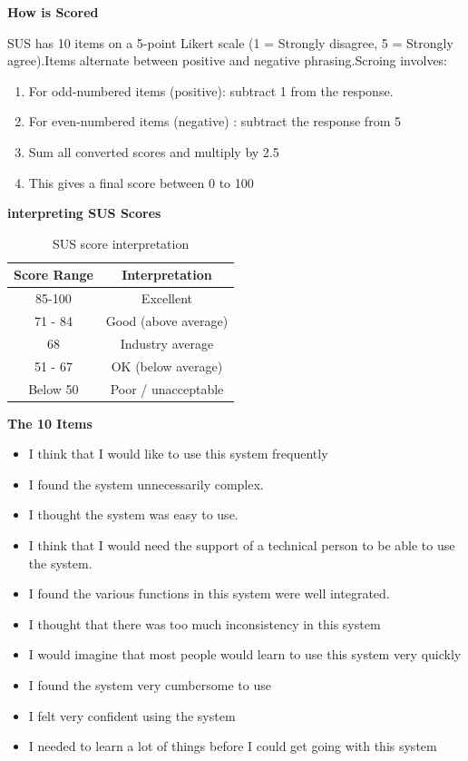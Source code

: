 \documentclass[12pt]{article}
\begin{document}
\textbf{How is Scored}

SUS has 10 items on a 5-point Likert scale (1 = Strongly disagree, 5 = Strongly agree).Items alternate between positive and negative phrasing.Scroing involves:
\begin{enumerate}
    \item For odd-numbered items (positive): subtract 1 from the response.
    \item For even-numbered items (negative) : subtract the response from 5
    \item Sum all converted scores and multiply by 2.5
    \item This gives a final score between 0 to 100
\end{enumerate}

\textbf{interpreting SUS Scores}
\begin{table}[h]
    \centering
    \begin{tabular}{c|c}
       \textbf{Score Range}  
         &  \textbf{Interpretation}
         \\
         \hline
         85-100 & Excellent
         \\
         \hline
         71 - 84 & Good (above average)
         \\
         \hline
         68 & Industry average
         \\
         \hline
         51 - 67 & OK (below average)
         \\
         \hline
         Below 50 & Poor / unacceptable
    \end{tabular}
    \caption{SUS score interpretation}
    \label{tab:placeholder}
\end{table}

\textbf{The 10 Items}
\begin{itemize}
    \item I think that I would like to use this system frequently
    \item I found the system unnecessarily complex.
    \item I thought the system was easy to use.
    \item I think that I would need the support of a technical person to be able to use the system.
    \item I found the various functions in this system were well integrated.
    \item I thought that there was too much inconsistency in this system
    \item I would imagine that most people would learn to use this system very quickly
    \item I found the system very cumbersome to use
    \item I felt very confident using the system
    \item I needed to learn a lot of things before I could get going with this system
\end{itemize}
\end{document}
